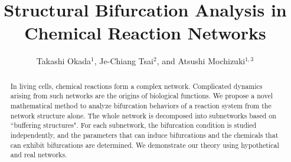 \documentclass[ amsmath,amssymb,nofootinbib
]{revtex4-1}
\begin{document}
\title{Structural Bifurcation Analysis in Chemical Reaction Networks}

\author{Takashi Okada$^{1}$, Je-Chiang Tsai$^{2}$, and Atsushi Mochizuki$^{1,3}$}

\begin{abstract}



In living cells, chemical reactions form a complex network. Complicated dynamics arising from such networks are the origins of biological functions. We propose a novel mathematical method to analyze bifurcation behaviors of a reaction system from the network structure alone. The whole network is decomposed into subnetworks based on ``buffering structures". For each subnetwork, the bifurcation condition is studied independently, and the parameters that can induce bifurcations and the chemicals that can exhibit bifurcations are determined. We demonstrate our theory using hypothetical and real networks.

\end{abstract}

\maketitle
\end{document}

